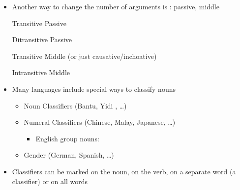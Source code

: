 \documentclass[headrule,footrule]{foils}
\begin{document}



\begin{itemize}
\item  Another way to change the number of arguments is 
: passive, middle
\begin{exe}
  \ex Transitive Passive
  \begin{xlist}
    \ex {}
    \ex {}
  \end{xlist}
  \ex Ditransitive Passive
  \begin{xlist}
    \ex {}
    \ex {}
  \end{xlist}
  \ex Transitive Middle (or just causative/inchoative)
  \begin{xlist}
    \ex {}
    \ex {}
  \end{xlist}
  \ex Intransitive Middle
  \begin{xlist}
    \ex {}
    \ex {}
  \end{xlist}
\end{exe}
\end{itemize}




\MyLogo{}
\begin{itemize}
\item  Many languages include special ways to classify 
nouns
\begin{itemize}
\item  Noun Classifiers (Bantu, Yidi , \ldots) 
\item  Numeral Classifiers (Chinese, Malay, Japanese, \ldots)
  \begin{itemize}
  \item English group nouns: 
  \end{itemize}
\item  Gender (German, Spanish, \ldots)  
\end{itemize}
\item Classifiers can be marked on the noun, on the verb, on a
  separate word (a classifier) or on all words
\end{itemize}
\end{document}
